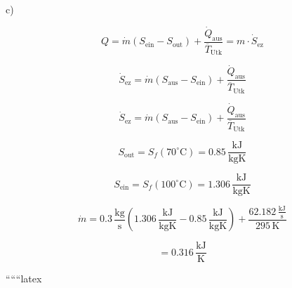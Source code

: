 c)

\[
Q = \dot{m} \left( S_{\text{ein}} - S_{\text{out}} \right) + \frac{\dot{Q}_{\text{aus}}}{\overline{T}_{\text{Utk}}} = m \cdot \dot{S}_{\text{ez}}
\]

\[
\dot{S}_{\text{ez}} = \dot{m} \left( S_{\text{aus}} - S_{\text{ein}} \right) + \frac{\dot{Q}_{\text{aus}}}{\overline{T}_{\text{Utk}}}
\]

\[
\dot{S}_{\text{ez}} = \dot{m} \left( S_{\text{aus}} - S_{\text{ein}} \right) + \frac{\dot{Q}_{\text{aus}}}{\overline{T}_{\text{Utk}}}
\]

\[
S_{\text{out}} = S_f (70^\circ \text{C}) = 0.85 \, \frac{\text{kJ}}{\text{kgK}}
\]

\[
S_{\text{ein}} = S_f (100^\circ \text{C}) = 1.306 \, \frac{\text{kJ}}{\text{kgK}}
\]

\[
\dot{m} = 0.3 \, \frac{\text{kg}}{\text{s}} \left( 1.306 \, \frac{\text{kJ}}{\text{kgK}} - 0.85 \, \frac{\text{kJ}}{\text{kgK}} \right) + \frac{62.182 \, \frac{\text{kJ}}{\text{s}}}{295 \, \text{K}}
\]

\[
= 0.316 \, \frac{\text{kJ}}{\text{K}}
\]

``````latex